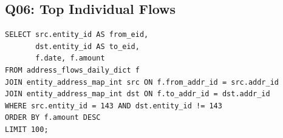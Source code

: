 \documentclass[11pt,a4paper]{article}
\begin{document}
\subsection*{Q06: Top Individual Flows}

\begin{lstlisting}
SELECT src.entity_id AS from_eid,
       dst.entity_id AS to_eid,
       f.date, f.amount
FROM address_flows_daily_dict f
JOIN entity_address_map_int src ON f.from_addr_id = src.addr_id
JOIN entity_address_map_int dst ON f.to_addr_id = dst.addr_id
WHERE src.entity_id = 143 AND dst.entity_id != 143
ORDER BY f.amount DESC
LIMIT 100;
\end{lstlisting}
\end{document}
